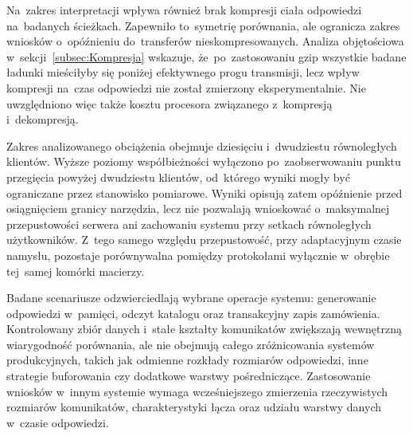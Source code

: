 Na~zakres interpretacji wpływa również brak kompresji ciała odpowiedzi na~badanych ścieżkach. Zapewniło to~symetrię porównania, ale ogranicza zakres wniosków o~opóźnieniu do~transferów nieskompresowanych. Analiza objętościowa w~sekcji~\ref{subsec:Kompresja} wskazuje, że~po~zastosowaniu gzip wszystkie badane ładunki mieściłyby się poniżej efektywnego progu transmisji, lecz wpływ kompresji na~czas odpowiedzi nie został zmierzony eksperymentalnie. Nie uwzględniono więc także kosztu procesora związanego z~kompresją i~dekompresją.

Zakres analizowanego obciążenia obejmuje dziesięciu i~dwudziestu równoległych klientów. Wyższe poziomy współbieżności wyłączono po~zaobserwowaniu punktu przegięcia powyżej dwudziestu klientów, od~którego wyniki mogły być ograniczane przez stanowisko pomiarowe. Wyniki opisują zatem opóźnienie przed osiągnięciem granicy narzędzia, lecz nie pozwalają wnioskować o~maksymalnej przepustowości serwera ani zachowaniu systemu przy setkach równoległych użytkowników. Z~tego samego względu przepustowość, przy adaptacyjnym czasie namysłu, pozostaje porównywalna pomiędzy protokołami wyłącznie w~obrębie tej~samej komórki macierzy.

Badane scenariusze odzwierciedlają wybrane operacje systemu: generowanie odpowiedzi w~pamięci, odczyt katalogu oraz transakcyjny zapis zamówienia. Kontrolowany zbiór danych i~stałe kształty komunikatów zwiększają wewnętrzną wiarygodność porównania, ale nie obejmują całego zróżnicowania systemów produkcyjnych, takich jak odmienne rozkłady rozmiarów odpowiedzi, inne strategie buforowania czy dodatkowe warstwy pośredniczące. Zastosowanie wniosków w~innym systemie wymaga wcześniejszego zmierzenia rzeczywistych rozmiarów komunikatów, charakterystyki łącza oraz udziału warstwy danych w~czasie odpowiedzi.
